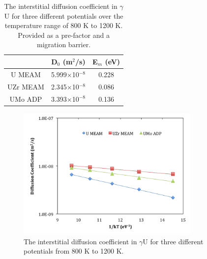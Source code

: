 \documentclass[review]{elsarticle}
\begin{document}
\begin{table}[h]
\caption{The interstitial diffusion coefficient in $\gamma$U for three different potentials over the temperature range of 800 K to 1200 K. Provided as a pre-factor and a migration barrier.} \label{tab:diff}
\begin{center}
\begin{tabular}{|c|c|c|}
	\hline
	& D$_{0}$ (m$^{2}$/s) & E$_{m}$ (eV)\\
	 \hline
	U MEAM & 5.999$\times$10$^{-8}$ & 0.228 \\
	UZr MEAM & 2.345$\times$10$^{-8}$ & 0.086 \\
	UMo ADP & 3.393$\times$10$^{-8}$ & 0.136 \\
	\hline
\end{tabular}
\end{center}
\label{default}
\end{table}


\begin{figure}[h]
 \centering
 \includegraphics[width=0.8\textwidth]{diffa.png} %
 \caption{The interstitial diffusion coefficient in $\gamma$U for three different potentials from 800 K to 1200 K.}
 \label{fig:gamUdiff}
\end{figure}

\FloatBarrier
\end{document}
